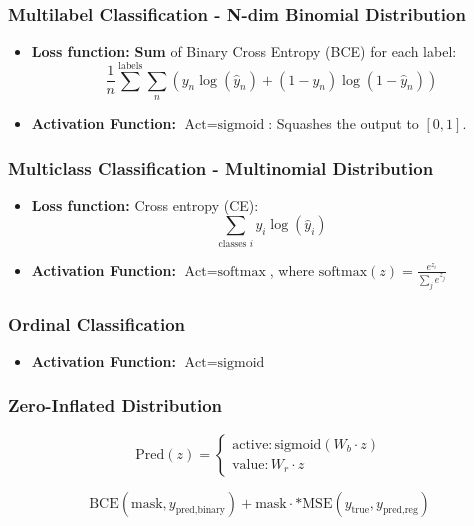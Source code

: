 \subsubsection{Multilabel Classification - N-dim Binomial Distribution}
\begin{notes}
    \begin{itemize}
        \item \textbf{Loss function:} \textbf{Sum} of Binary Cross Entropy (BCE) for each label:
        \[
        \frac{1}{n} \sum^{\text{labels}} \sum_n \left( y_n \log(\hat{y}_n) + (1 - y_n) \log(1 - \hat{y}_n) \right)
        \]
        \item \textbf{Activation Function:} $\text{Act} = \text{sigmoid}$: Squashes the output to $[0, 1].$
    \end{itemize}
\end{notes}

\subsubsection{Multiclass Classification - Multinomial Distribution}
\begin{notes}
    \begin{itemize}
        \item \textbf{Loss function:} Cross entropy (CE):
        \[
        \sum_{\text{classes } i} y_i \log(\hat{y}_i)
        \]
        \item \textbf{Activation Function:} $\text{Act} = \text{softmax}$, where $\text{softmax}(z) = \frac{e^{z_i}}{\sum_j e^{z_j}}$
    \end{itemize}
\end{notes}

\subsubsection{Ordinal Classification}
\begin{notes}
    \begin{itemize}
        \item \textbf{Activation Function:} $\text{Act} = \text{sigmoid}$
    \end{itemize}
\end{notes}

\subsubsection{Zero-Inflated Distribution}
\begin{example}
    \[
    \text{Pred}(z) =
    \begin{cases}
        \text{active}: \text{sigmoid}(W_b \cdot z) \\
        \text{value}: W_r \cdot z
    \end{cases}
    \]

    \[
    \text{BCE}(\text{mask}, y_{\text{pred,binary}}) + \text{mask} \cdot * \text{MSE}(y_{\text{true}}, y_{\text{pred,reg}})
    \]
\end{example}
